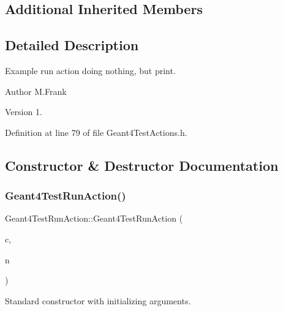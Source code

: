 \subsection*{Additional Inherited Members}


\subsection{Detailed Description}
Example run action doing nothing, but print. 

\begin{DoxyAuthor}{Author}
M.\+Frank 
\end{DoxyAuthor}
\begin{DoxyVersion}{Version}
1. 
\end{DoxyVersion}


Definition at line 79 of file Geant4\+Test\+Actions.\+h.



\subsection{Constructor \& Destructor Documentation}
\hypertarget{class_d_d4hep_1_1_simulation_1_1_test_1_1_geant4_test_run_action_a59369c3b9a84e951c2885a3ec331b360}{}\label{class_d_d4hep_1_1_simulation_1_1_test_1_1_geant4_test_run_action_a59369c3b9a84e951c2885a3ec331b360} 
\subsubsection{\texorpdfstring{Geant4\+Test\+Run\+Action()}{Geant4TestRunAction()}}
{\footnotesize\ttfamily Geant4\+Test\+Run\+Action\+::\+Geant4\+Test\+Run\+Action (\begin{DoxyParamCaption}\item[{\hyperlink{class_d_d4hep_1_1_simulation_1_1_geant4_context}{Geant4\+Context} $\ast$}]{c,  }\item[{const std\+::string \&}]{n }\end{DoxyParamCaption})}



Standard constructor with initializing arguments. 



